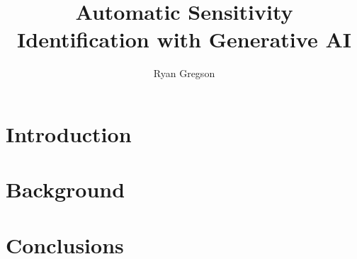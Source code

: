\documentclass{mpaper}
\begin{document}
\title{Automatic Sensitivity Identification with Generative AI}
\author{Ryan Gregson}

\maketitle



\begin{abstract}

\end{abstract}

\section{Introduction}


\section{Background}








\section{Conclusions}


\vspace{0.5cm}

%



\end{document}

